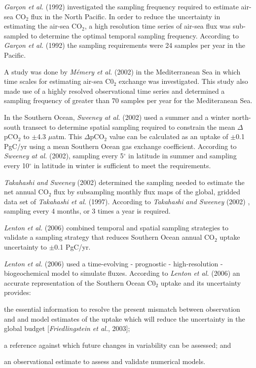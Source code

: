 \documentclass[11pt, a4paper]{article}
\numberwithin{figure}{section}
\numberwithin{table}{section}
\begin{document}
\emph{Gar\c{c}on et al.} (1992) investigated the sampling frequency required to 
estimate air-sea CO$_2$ flux in the North Pacific. In order to reduce the uncertainty
in estimating the air-sea CO$_2$, a high resolution time series of air-sea flux
was sub-sampled to determine the optimal temporal sampling frequency. According to 
\emph{Gar\c{c}on et al.} (1992) the sampling requirements were 24 samples per year
in the Pacific.

A study was done by \emph{M\'{e}mery et al.} (2002) in the Mediterranean Sea in which 
time scales for estimating air-sea C0$_2$ exchange was investigated. This study also 
made use of a highly resolved observational time series and determined a sampling frequency 
of greater than 70 samples per year for the Mediteranean Sea.

In the Southern Ocean, \emph{Sweeney at al.} (2002) used a summer and a winter
north-south transect to determine spatial sampling required to constrain the mean 
$\Delta$pCO$_2$ to $\pm$4.3 $\mu$atm. This $\Delta$pCO$_2$ value can be calculated as
an uptake of $\pm$0.1 PgC/yr using a mean Southern Ocean gas exchange coefficient.
According to \emph{Sweeney at al.} (2002), sampling every 5$^\circ$ in latitude in summer
and sampling every 10$^\circ$ in latitude in winter is sufficient to meet the requirements.

\emph{Takahashi and Sweeney} (2002) determined the sampling needed to estimate the
net annual CO$_2$ flux by subsampling monthly flux maps of the global, gridded data set of
\emph{Takahashi et al.} (1997). According to \emph{Takahashi and Sweeney} (2002)
, sampling every 4 months, or 3 times a year is required.

\emph{Lenton et al.} (2006) combined temporal and spatial sampling strategies to 
validate a sampling strategy that reduces Southern Ocean annual CO$_2$ uptake uncertainty
to $\pm$0.1 PgC/yr.

\emph{Lenton et al.} (2006) used a time-evolving - prognostic - high-resolution
- biogeochemical model to simulate fluxes. According to \emph{Lenton et al.} (2006) 
an accurate representation of the Southern Ocean C0$_2$ uptake and its uncertainty provides: 
\begin{inparaenum}[(1)]
\item the essential information to resolve the present mismatch between observation and 
and model estimates of the uptake which will reduce the uncertainty in the global
budget [\emph{Friedlingstein et al.}, 2003]; 
\item a reference against which future changes in variability can be assessed; and
\item an observational estimate to assess and validate numerical models.
\end{inparaenum}
\end{document}
